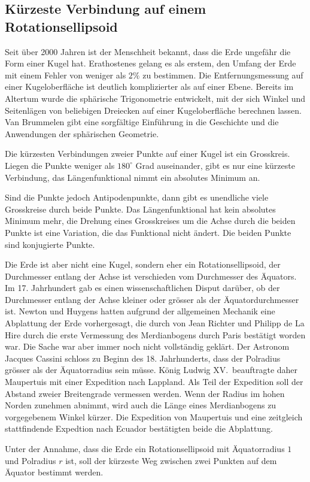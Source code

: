 %
%
\subsection{Kürzeste Verbindung auf einem Rotationsellipsoid}
Seit über 2000 Jahren ist der Menschheit bekannt, dass die Erde
ungefähr die Form einer Kugel hat.
Erathostenes gelang es als erstem, den Umfang der Erde mit
einem Fehler von weniger als $2\%$ zu bestimmen.
Die Entfernungsmessung auf einer Kugeloberfläche ist deutlich
komplizierter als auf einer Ebene.
Bereits im Altertum wurde die sphärische Trigonometrie entwickelt,
mit der sich Winkel und Seitenlägen von beliebigen Dreiecken auf
einer Kugeloberfläche berechnen lassen.
Van Brummelen \cite{buch:heavenly} gibt eine sorgfältige Einführung
in die Geschichte und die Anwendungen der sphärischen Geometrie.

\begin{beispiel}
Die kürzesten Verbindungen zweier Punkte auf einer Kugel ist ein
Grosskreis.
Liegen die Punkte weniger als $180^\circ$ Grad auseinander, gibt es
nur eine kürzeste Verbindung, das Längenfunktional nimmt ein
absolutes Minimum an.

Sind die Punkte jedoch Antipodenpunkte, dann gibt es unendliche viele
Grosskreise durch beide Punkte.
Das Längenfunktional hat kein absolutes Minimum mehr, die Drehung eines
Grosskreises um die Achse durch die beiden Punkte ist eine Variation,
die das Funktional nicht ändert.
Die beiden Punkte sind konjugierte Punkte.
\end{beispiel}

Die Erde ist aber nicht eine Kugel, sondern eher ein Rotationsellipsoid,
der Durchmesser entlang der Achse ist verschieden vom Durchmesser des 
Äquators.
Im 17. Jahrhundert gab es einen wissenschaftlichen Disput darüber,
ob der Durchmesser entlang der Achse kleiner oder grösser als der
Äquatordurchmesser ist.
Newton und Huygens hatten aufgrund der allgemeinen Mechanik eine Abplattung
der Erde vorhergesagt, die durch von Jean Richter und Philipp de La Hire
durch die erste Vermessung des Merdianbogens durch Paris bestätigt 
worden war.
Die Sache war aber immer noch nicht vollständig geklärt.
Der Astronom Jacques Cassini schloss zu Beginn des 18. Jahrhunderts,
dass der Polradius grösser als der Äquatorradius sein müsse.
König Ludwig XV.~beauftragte daher Maupertuis mit einer Expedition
nach Lappland.
Als Teil der Expedition soll der Abstand zweier Breitengrade
vermessen werden.
Wenn der Radius im hohen Norden zunehmen abnimmt, wird auch die Länge
eines Merdianbogens zu vorgegebenem Winkel kürzer.
Die Expedition von Maupertuis und eine zeitgleich stattfindende Expedtion
nach Ecuador bestätigten beide die Abplattung.

\begin{beispiel}
Unter der Annahme, dass die Erde ein Rotationsellipsoid mit Äquatorradius
$1$ und Polradius $r$ ist, soll der kürzeste Weg zwischen zwei Punkten
auf dem Äquator bestimmt werden.
\end{beispiel}



